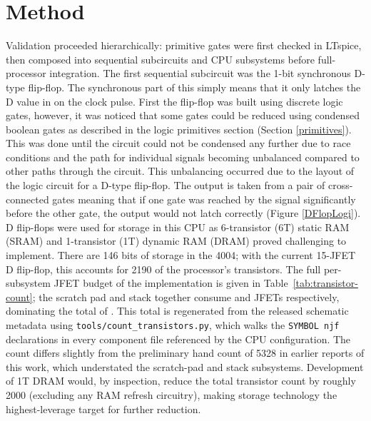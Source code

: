 \section{Method}\label{method}
Validation proceeded hierarchically: primitive gates were first checked in LTspice, then composed into sequential subcircuits and CPU subsystems before full-processor integration. The first sequential subcircuit was the 1-bit synchronous D-type flip-flop. The synchronous part of this simply means that it only latches the D value in on the clock pulse. First the flip-flop was built using discrete logic gates, however, it was noticed that some gates could be reduced using condensed boolean gates as described in the logic primitives section (Section \ref{primitives}). This was done until the circuit could not be condensed any further due to race conditions and the path for individual signals becoming unbalanced compared to other paths through the circuit. This unbalancing occurred due to the layout of the logic circuit for a D-type flip-flop. The output is taken from a pair of cross-connected gates meaning that if one gate was reached by the signal significantly before the other gate, the output would not latch correctly (Figure \ref{DFlopLogi}). D flip-flops were used for storage in this CPU as 6-transistor (6T) static RAM (SRAM) and 1-transistor (1T) dynamic RAM (DRAM) proved challenging to implement. There are 146 bits of storage in the 4004; with the current 15-JFET D flip-flop, this accounts for 2190 of the processor's transistors. The full per-subsystem JFET budget of the implementation is given in Table~\ref{tab:transistor-count}; the scratch pad and stack together consume \JFETCountScratch{} and \JFETCountStack{} JFETs respectively, dominating the total of \TotalJFETCount{}. This total is regenerated from the released schematic metadata using \texttt{tools/count\_transistors.py}, which walks the \texttt{SYMBOL njf} declarations in every component file referenced by the CPU configuration. The count differs slightly from the preliminary hand count of 5328 in earlier reports of this work, which understated the scratch-pad and stack subsystems. Development of 1T DRAM would, by inspection, reduce the total transistor count by roughly 2000 (excluding any RAM refresh circuitry), making storage technology the highest-leverage target for further reduction.


